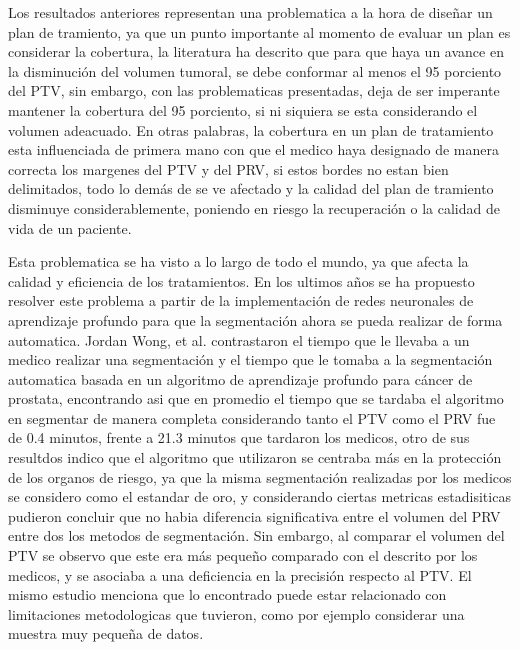 \documentclass{article}
\begin{document}
\vspace{10pt}


Los resultados anteriores representan una problematica a la hora de diseñar un plan de tramiento, ya que un punto importante al momento de evaluar un plan es considerar la cobertura, la literatura ha descrito que para que haya un avance en la disminución del volumen tumoral, se debe conformar al menos el 95 porciento del PTV, sin embargo, con las problematicas presentadas, deja de ser imperante mantener la cobertura del 95 porciento, si ni siquiera se esta considerando el volumen adeacuado. En otras palabras, la cobertura en un plan de tratamiento esta influenciada de primera mano con que el medico haya designado de manera correcta los margenes del PTV y del PRV, si estos bordes no estan bien delimitados, todo lo demás de se ve afectado y la calidad del plan de tramiento disminuye considerablemente, poniendo en riesgo la recuperación o la calidad de vida de un paciente. 

\vspace{10pt}


Esta problematica se ha visto a lo largo de todo el mundo, ya que afecta la calidad y eficiencia de los tratamientos. En los ultimos años se ha propuesto resolver este problema a partir de la implementación de redes neuronales de aprendizaje profundo para que la segmentación ahora se pueda realizar de forma automatica. Jordan Wong, et al. contrastaron el tiempo que le llevaba a un medico realizar una segmentación y el tiempo que le tomaba a la segmentación automatica basada en un algoritmo de aprendizaje profundo para cáncer de prostata, encontrando asi que en promedio el tiempo que se tardaba el algoritmo en segmentar de manera completa considerando tanto el PTV como el PRV fue de 0.4 minutos, frente a 21.3 minutos que tardaron los medicos, otro de sus resultdos indico que el algoritmo que utilizaron se centraba más en la protección de los organos de riesgo, ya que la misma segmentación realizadas por los medicos se considero como el estandar de oro, y considerando ciertas metricas estadisiticas pudieron concluir que no habia diferencia significativa entre el volumen del PRV entre dos los metodos de segmentación. Sin embargo, al comparar el volumen del PTV se observo que este era más pequeño comparado con el descrito por los medicos, y se asociaba a una deficiencia en la precisión respecto al PTV. El mismo estudio menciona que lo encontrado puede estar relacionado con limitaciones metodologicas que tuvieron, como por ejemplo considerar una muestra muy pequeña de datos. 
\end{document}
